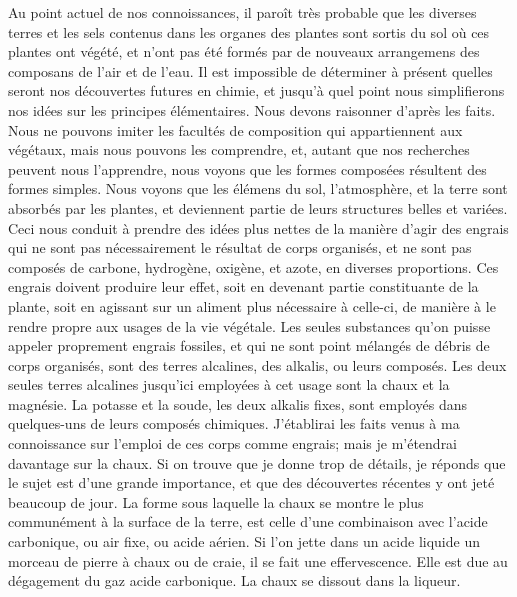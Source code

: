 Au point actuel de nos connoissances, il paroît très probable que les diverses terres et les sels contenus dans les organes des plantes sont sortis du sol où ces plantes ont végété, et n'ont pas été formés par de nouveaux arrangemens des composans de l'air et de l'eau. Il est impossible de déterminer à présent quelles seront nos découvertes futures en chimie, et jusqu'à quel point nous simplifierons nos idées sur les principes élémentaires.\setcounter{page}{215} Nous devons raisonner d'après les faits. Nous ne pouvons imiter les facultés de composition qui appartiennent aux végétaux, mais nous pouvons les comprendre, et, autant que nos recherches peuvent nous l'apprendre, nous voyons que les formes composées résultent des formes simples. Nous voyons que les élémens du sol, l'atmosphère, et la terre sont absorbés par les plantes, et deviennent partie de leurs structures belles et variées.
Ceci nous conduit à prendre des idées plus nettes de la manière d'agir des engrais qui ne sont pas nécessairement le résultat de corps organisés, et ne sont pas composés de carbone, hydrogène, oxigène, et azote, en diverses proportions. Ces engrais doivent produire leur effet, soit en devenant partie constituante de la plante, soit en agissant sur un aliment plus nécessaire à celle-ci, de manière à le rendre propre aux usages de la vie végétale.
Les seules substances qu'on puisse appeler proprement engrais fossiles, et qui ne sont point mélangés de débris de corps organisés, sont des terres alcalines, des alkalis, ou leurs composés.
Les deux seules terres alcalines jusqu'ici\setcounter{page}{216} employées à cet usage sont la chaux et la magnésie. La potasse et la soude, les deux alkalis fixes, sont employés dans quelques-uns de leurs composés chimiques. J'établirai les faits venus à ma connoissance sur l'emploi de ces corps comme engrais; mais je m'étendrai davantage sur la chaux. Si on trouve que je donne trop de détails, je réponds que le sujet est d'une grande importance, et que des découvertes récentes y ont jeté beaucoup de jour.
La forme sous laquelle la chaux se montre le plus communément à la surface de la terre, est celle d'une combinaison avec l'acide carbonique, ou air fixe, ou acide aérien. Si l'on jette dans un acide liquide un morceau de pierre à chaux ou de craie, il se fait une effervescence. Elle est due au dégagement du gaz acide carbonique. La chaux se dissout dans la liqueur.
